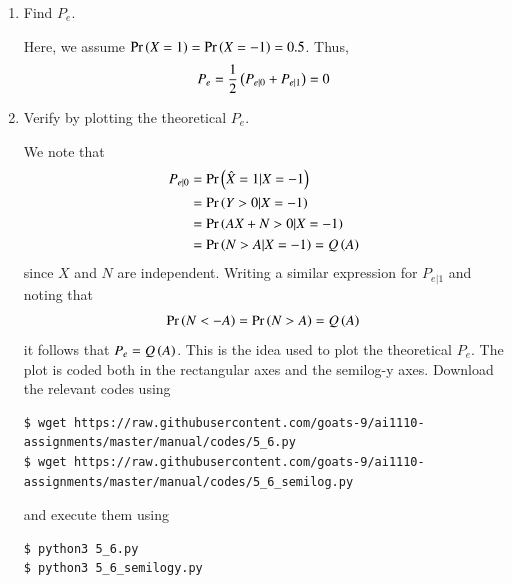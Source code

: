 \documentclass[journal,12pt,twocolumn]{IEEEtran}
\renewcommand\thesection{\arabic{section}}
\begin{document}
\begin{enumerate}[label=\thesection.\arabic*
,ref=\thesection.\theenumi]
\solution
Letting $X = 1$ and $X = -1$ respectively, we see the number of mismatched data points to compute the error probabilities. The simulation is coded in
\begin{lstlisting}
$ wget https://raw.githubusercontent.com/goats-9/ai1110-assignments/master/manual/codes/5_4.py
\end{lstlisting}
and can be run by typing
\begin{lstlisting}
$ python3 5_4.py
\end{lstlisting}
The results are
		\begin{align}
			P_{e|0} = 0 \\
			P_{e|1} = 0
		\end{align}
\item Find $P_e$.

\solution
Here, we assume $\Pr\left(X = 1\right) = \Pr\left(X = -1\right) = 0.5$. Thus,
	\begin{align}
		P_e = \frac{1}{2}\left(P_{e|0} + P_{e|1}\right) = 0
	\end{align}
\item Verify by plotting the theoretical $P_e$.

\solution
We note that 
\begin{align}
	P_{e|0} &= \Pr\left(\hat{X} = 1 | X = -1\right)\\
	&= \Pr\left(Y > 0 | X = -1\right) \\
	&= \Pr\left(AX + N > 0 | X = -1\right) \\
	&= \Pr\left(N > A | X = -1\right) = Q\left(A\right)
\end{align}
since $X$ and $N$ are independent. Writing a similar expression for $P_{e|1}$ and noting that 
\begin{align}
	\Pr\left(N < -A\right) = \Pr\left(N > A\right) = Q\left(A\right)
\end{align}
it follows that $P_e = Q\left(A\right)$. This is the idea used to plot the theoretical $P_e$. The plot is coded both in the rectangular axes and the semilog-y axes. Download the relevant codes using 
\begin{lstlisting}
$ wget https://raw.githubusercontent.com/goats-9/ai1110-assignments/master/manual/codes/5_6.py
$ wget https://raw.githubusercontent.com/goats-9/ai1110-assignments/master/manual/codes/5_6_semilog.py
\end{lstlisting}
and execute them using
\begin{lstlisting}
$ python3 5_6.py
$ python3 5_6_semilogy.py
\end{lstlisting}


\end{enumerate}
\end{document}
